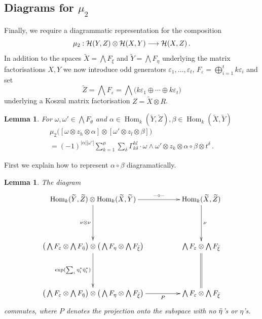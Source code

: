 \documentclass[english,letter paper,12pt,leqno]{article}
\newtheorem{lemma}[theorem]{Lemma}
\theoremstyle{example}
\numberwithin{equation}{section}
\def\HH{\HH}
\def\HH{\mathcal{H}}
\def\Hom{\operatorname{Hom}}
\def\be{\begin{equation}}
\def\ee{\end{equation}}
\begin{document}
\subsection{Diagrams for $\mu_2$}\label{section:feynman_diagram_3}

Finally, we require a diagrammatic representation for the composition
\[
\mu_2: \HH(Y, Z) \otimes \HH(X, Y) \lto \HH(X,Z)\,.
\]
In addition to the spaces $\widetilde{X} = \bigwedge F_\xi$ and $\widetilde{Y} = \bigwedge F_\eta$ underlying the matrix factorisations $X,Y$ we now introduce odd generators $\varepsilon_1,\ldots,\varepsilon_t$, $F_\varepsilon = \bigoplus_{i=1}^t k \varepsilon_i$ and set
\[
\widetilde{Z} = \bigwedge F_\varepsilon = \bigwedge\big( k \varepsilon_1 \oplus \cdots \oplus k \varepsilon_t \big)
\]
underlying a Koszul matrix factorisation $Z = \widetilde{X} \otimes R$. 

\begin{lemma}\label{lemma_mu2presentation} For $\omega, \omega' \in \bigwedge F_\theta$ and $\alpha \in \Hom_k(\widetilde{Y}, \widetilde{Z}), \beta \in \Hom_k(\widetilde{X}, \widetilde{Y})$
\begin{gather*}
\mu_2\Big( [ \omega \otimes z_h \otimes \alpha ] \otimes [ \omega' \otimes z_l \otimes \beta ] \Big) \\
= (-1)^{|\alpha||\omega'|} \sum_{k=1}^\mu \sum_{\delta} \Gamma^{hl}_{k \delta} \cdot \omega \wedge \omega' \otimes z_k \otimes \alpha \circ \beta \otimes t^{\delta}\,.
\end{gather*}
\end{lemma}

First we explain how to represent $\alpha \circ \beta$ diagramatically. %

\begin{lemma}\label{lemma:mixedr2_0} The diagram
\be
\xymatrix@C+2pc@R+2pc{
\Hom_k( \widetilde{Y}, \widetilde{Z} ) \otimes \Hom_k( \widetilde{X}, \widetilde{Y} ) \ar[d]_-{\nu \otimes \nu} \ar[r]^-{- \circ -} & \Hom_k( \widetilde{X}, \widetilde{Z} ) \ar[d]^-\nu\\
\big( \bigwedge F_\varepsilon \otimes \bigwedge F_{\Bar{\eta}} \big) \otimes \big( \bigwedge F_\eta \otimes \bigwedge F_{\Bar{\xi}} \big) \ar[d]_-{\exp( \sum_i \eta_i^* \Bar{\eta}_i^* )} & \bigwedge F_\varepsilon \otimes \bigwedge F_{\Bar{\xi}} \ar@{=}[d]\\
\big( \bigwedge F_\varepsilon \otimes \bigwedge F_{\Bar{\eta}} \big) \otimes \big( \bigwedge F_\eta \otimes \bigwedge F_{\Bar{\xi}} \big) \ar[r]_-P & \bigwedge F_\varepsilon \otimes \bigwedge F_{\Bar{\xi}}
}
\ee
commutes, where $P$ denotes the projection onto the subspace with no $\Bar{\eta}$'s or $\eta$'s.
\end{lemma}
\end{document}
